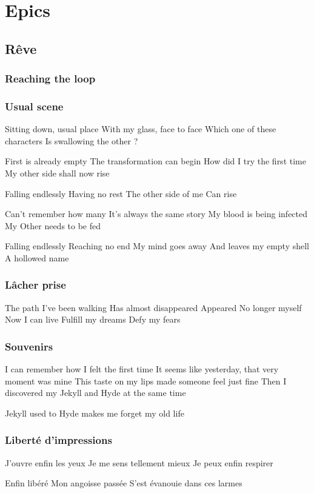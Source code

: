 \documentclass{article}
\newenvironment{album}[1]%
{%
  \section*{#1}
}%
{%
}
\newenvironment{song}[1]%
{%
  \subsection*{\textbf{#1}}
  \begin{multicols*}{2}
}%
{%
  \end{multicols*}
  \newpage
}
\newenvironment{partie}[1]%
{%
  \subsubsection{#1}
}%
{%
}
\newenvironment{couplet} %
{%
  \verbatim
}%
{% end code
  \endverbatim
}
\newenvironment{refrain} %
{%
  \verbatim
}%
{% end code
  \endverbatim
}
\begin{document}
\begin{album}{Epics}
\begin{song}{Rêve}
\begin{partie}{Reaching the loop}
\end{partie}
\begin{partie}{Usual scene}
\begin{couplet}
Sitting down, usual place
With my glass, face to face
Which one of these characters
Is swallowing the other ?
\end{couplet}
\begin{couplet}
First is already empty
The transformation can begin
How did I try the first time
My other side shall now rise  
\end{couplet}
\begin{refrain}
Falling endlessly
Having no rest
The other side of me
Can rise
\end{refrain}
\begin{couplet}
Can't remember how many
It's always the same story
My blood is being infected
My Other needs to be fed  
\end{couplet}
\begin{refrain}
Falling endlessly
Reaching no end
My mind goes away
And leaves my empty shell
A hollowed name  
\end{refrain}
\end{partie}
\begin{partie}{Lâcher prise}
\begin{couplet}
The path I've been walking
Has almost disappeared
Appeared
No longer myself
Now I can live
Fulfill my dreams
Defy my fears
\end{couplet}
\end{partie}
\begin{partie}{Souvenirs}
\begin{couplet}
I can remember how I felt the first time
It seems like yesterday, that very moment was mine
This taste on my lips made someone feel just fine
Then I discovered my Jekyll and Hyde at the same time  
\end{couplet}
\begin{couplet}
Jekyll used to Hyde makes me forget my old life  
\end{couplet}
\end{partie}
\begin{partie}{Liberté d'impressions}
\begin{couplet}
J'ouvre enfin les yeux
Je me sens tellement mieux
Je peux enfin respirer  
\end{couplet}
\begin{refrain}
Enfin libéré
Mon angoisse passée
S'est évanouie dans ces larmes


\end{refrain}
\end{partie}
\end{song}
\end{album}
\end{document}
